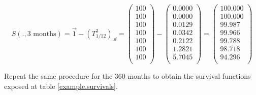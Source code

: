 \documentclass[a4paper,12pt,final]{article}
\begin{document}
\begin{displaymath}
S(.,3 \textrm{ months}) = \vec{1} - (T_{1/12}^3)_{.d} = 
\left( 
\begin{array}{c}
 100 \\
 100 \\
 100 \\
 100 \\
 100 \\
 100 \\
 100 \\
\end{array}
\right)
 - 
\left( 
\begin{array}{c}
 0.0000 \\
 0.0000 \\
 0.0129 \\
 0.0342 \\
 0.2122 \\
 1.2821 \\
 5.7045 \\
\end{array}
\right)
=
\left( 
\begin{array}{c}
 100.000 \\
 100.000 \\
  99.987 \\
  99.966 \\
  99.788 \\
  98.718 \\
  94.296 \\
\end{array}
\right)
\end{displaymath}

Repeat the same procedure for the $360$ months to obtain the survival
functions exposed at table \ref{example.survivals}.

\clearpage 
\end{document}
